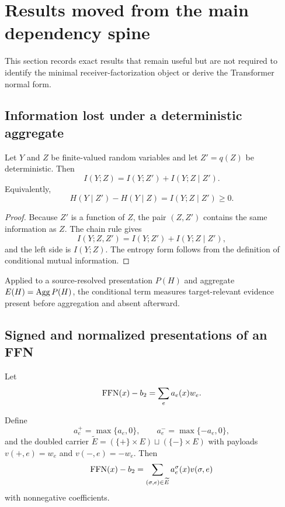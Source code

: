 \section{Results moved from the main dependency spine}\label{supp:moved-results}

This section records exact results that remain useful but are not required to identify the minimal receiver-factorization object or derive the Transformer normal form.

\subsection{Information lost under a deterministic aggregate}

\begin{proposition}\label{prop:supp-information-loss}
Let $Y$ and $Z$ be finite-valued random variables and let $Z'=q(Z)$ be deterministic. Then
\[
\boxed{
I(Y;Z)=I(Y;Z')+I(Y;Z\mid Z').
}
\]
Equivalently,
\[
H(Y\mid Z')-H(Y\mid Z)=I(Y;Z\mid Z')\ge0.
\]
\end{proposition}

\begin{proof}
Because $Z'$ is a function of $Z$, the pair $(Z,Z')$ contains the same information as $Z$. The chain rule gives
\[
I(Y;Z,Z')=I(Y;Z')+I(Y;Z\mid Z'),
\]
and the left side is $I(Y;Z)$. The entropy form follows from the definition of conditional mutual information.
\end{proof}

Applied to a source-resolved presentation $P(H)$ and aggregate $E(H)=\operatorname{Agg} P(H)$, the conditional term measures target-relevant evidence present before aggregation and absent afterward.

\subsection{Signed and normalized presentations of an FFN}

Let
\[
\operatorname{FFN}(x)-b_2=\sum_ea_e(x)w_e.
\]

\begin{corollary}\label{cor:supp-ffn-signed}
Define
\[
a_e^+=\max\{a_e,0\},
\qquad
a_e^-=\max\{-a_e,0\},
\]
and the doubled carrier $\widetilde E=(\{+\}\times E)\sqcup(\{-\}\times E)$ with payloads $v(+,e)=w_e$ and $v(-,e)=-w_e$. Then
\[
\operatorname{FFN}(x)-b_2
=
\sum_{(\sigma,e)\in\widetilde E}a_e^\sigma(x)v(\sigma,e)
\]
with nonnegative coefficients.
\end{corollary}

